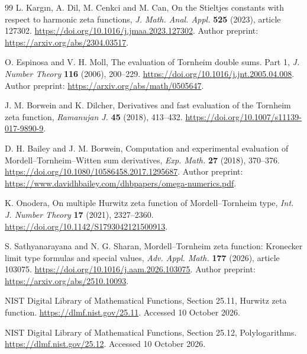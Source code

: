 \begin{thebibliography}{99}
L. Karg\i n, A. Dil, M. Cenkci and M. Can,
On the Stieltjes constants with respect to harmonic zeta functions,
\emph{J. Math. Anal. Appl.} \textbf{525} (2023), article 127302.
\url{https://doi.org/10.1016/j.jmaa.2023.127302}.
Author preprint: \url{https://arxiv.org/abs/2304.03517}.

O. Espinosa and V. H. Moll,
The evaluation of Tornheim double sums. Part 1,
\emph{J. Number Theory} \textbf{116} (2006), 200--229.
\url{https://doi.org/10.1016/j.jnt.2005.04.008}.
Author preprint: \url{https://arxiv.org/abs/math/0505647}.

J. M. Borwein and K. Dilcher,
Derivatives and fast evaluation of the Tornheim zeta function,
\emph{Ramanujan J.} \textbf{45} (2018), 413--432.
\url{https://doi.org/10.1007/s11139-017-9890-9}.

D. H. Bailey and J. M. Borwein,
Computation and experimental evaluation of Mordell--Tornheim--Witten
sum derivatives,
\emph{Exp. Math.} \textbf{27} (2018), 370--376.
\url{https://doi.org/10.1080/10586458.2017.1295687}.
Author preprint:
\url{https://www.davidhbailey.com/dhbpapers/omega-numerics.pdf}.

K. Onodera, On multiple Hurwitz zeta function of Mordell--Tornheim type,
\emph{Int. J. Number Theory} \textbf{17} (2021), 2327--2360.
\url{https://doi.org/10.1142/S1793042121500913}.

S. Sathyanarayana and N. G. Sharan,
Mordell--Tornheim zeta function: Kronecker limit type formulas and
special values,
\emph{Adv. Appl. Math.} \textbf{177} (2026), article 103075.
\url{https://doi.org/10.1016/j.aam.2026.103075}.
Author preprint: \url{https://arxiv.org/abs/2510.10093}.

NIST Digital Library of Mathematical Functions,
Section 25.11, Hurwitz zeta function.
\url{https://dlmf.nist.gov/25.11}. Accessed 10 October 2026.

NIST Digital Library of Mathematical Functions,
Section 25.12, Polylogarithms.
\url{https://dlmf.nist.gov/25.12}. Accessed 10 October 2026.

\end{thebibliography}

